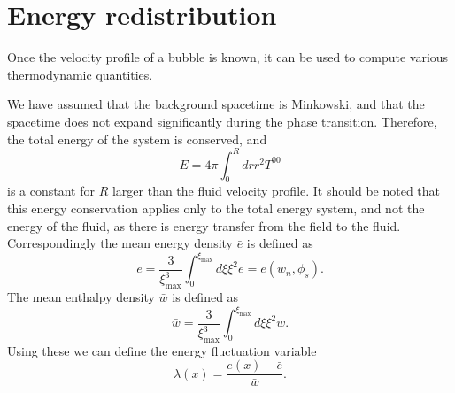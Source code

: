 \section{Energy redistribution}
\label{energy_redistribution}
Once the velocity profile of a bubble is known, it can be used to compute various thermodynamic quantities.

We have assumed that the background spacetime is Minkowski, and that the spacetime does not expand significantly during the phase transition.
Therefore, the total energy of the system is conserved, and
\begin{equation}
E = 4 \pi \int_0^R dr r^2 T^{00}
\end{equation}
is a constant for $R$ larger than the fluid velocity profile.
It should be noted that this energy conservation applies only to the total energy system,
and not the energy of the fluid, as there is energy transfer from the field to the fluid.
\cite[p. 21]{lecture_notes}
Correspondingly the mean energy density $\bar{e}$ is defined as \cite[p. 39]{lecture_notes}
\begin{equation}
\bar{e} = \frac{3}{\xi_\text{max}^3} \int_0^{\xi_\text{max}} d\xi \xi^2 e = e(w_n, \phi_s).
\label{eq:e_conservation}
\end{equation}
The mean enthalpy density $\bar{w}$ is defined as
\begin{equation}
\bar{w} = \frac{3}{\xi_\text{max}^3} \int_0^{\xi_\text{max}} d\xi \xi^2 w.
\label{eq:wbar}
\end{equation}
Using these we can define the energy fluctuation variable
\begin{equation}
\lambda(x) = \frac{e(x) - \bar{e}}{\bar{w}}.
\label{eq:lambda}
\end{equation}


